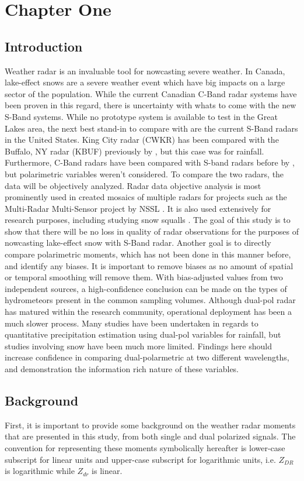 \chapter{Chapter One}
\section{Introduction}
Weather radar is an invaluable tool for nowcasting severe weather. In Canada, lake-effect snows are a severe weather event which have big impacts on a large
sector of the population. While the current Canadian C-Band radar systems have been proven in this regard, there is uncertainty with whats to come with the
new S-Band systems. While no prototype system is available to test in the Great Lakes area, the next best stand-in to compare with are the current S-Band
radars in the United States. King City radar (CWKR) has been compared with the Buffalo, NY radar (KBUF) previously by \cite{Boodoo2015}, but this case was
for rainfall. Furthermore, C-Band radars have been compared with S-band radars before by \cite{Abon2014}, but polarimetric variables weren't considered. To
compare the two radars, the data will be objectively analyzed. Radar data objective analysis is most prominently used in created mosaics of multiple radars
for projects such as the Multi-Radar Multi-Sensor project by NSSL \citep{Zhang2016}. It is also used extensively for research purposes, including studying
snow squalls \citep{Mulholland2017}.  The goal of this study is to show that there will be no loss in quality of radar observations for the purposes of
nowcasting lake-effect snow with S-Band radar. Another goal is to directly compare polarimetric moments, which has not been done in this manner before, and
identify any biases. It is important to remove biases as no amount of spatial or temporal smoothing will remove them. With bias-adjusted values from two independent sources, a high-confidence conclusion can be made on the types of hydrometeors present in the common sampling volumes. Although dual-pol radar has matured within the research community, operational deployment has been a much slower process. Many studies have been undertaken in regards to quantitative precipitation estimation using dual-pol variables for rainfall, but studies involving snow have been much more limited. Findings here should increase confidence in comparing dual-polarmetric at two different wavelengths, and demonstration the information rich nature of these variables. 
\section{Background}
First, it is important to provide some background on the weather radar moments that are presented in this study, from both single and dual polarized signals.
The convention for representing these moments symbolically hereafter is lower-case subscript for linear units and upper-case subscript for logarithmic units,
i.e. $Z_{DR}$ is logarithmic while $Z_{dr}$ is linear.
